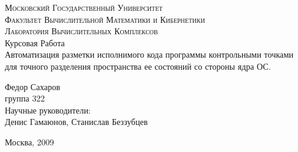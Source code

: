 \begin{titlepage}
	\begin{center}
	\textsc{\large{Московский Государственный Университет}
	\\[.5cm]
	\normalsize{Факультет Вычислительной Математики и Кибернетики\\
	Лаборатория Вычислительных Комплексов}}
	\\[4cm]

	\large{Курсовая Работа }\\[1.5cm]

	{\Large {Автоматизация разметки исполнимого кода программы 
	контрольными точками для точного разделения пространства 
	ее состояний со стороны ядра ОС.}} \\[3cm]
	\begin{flushright}
		Федор Сахаров\\
		группа 322\\
		
		Научные руководители: \\
		
		Денис Гамаюнов, Станислав Беззубцев
	\end{flushright}
	\vfill
	
	Москва, 2009
	\end{center}

\end{titlepage}

